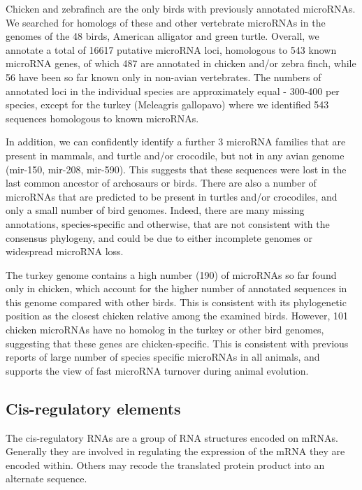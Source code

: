 \documentclass[10pt]{bmc_article}
\newenvironment{bmcformat}{\begin{raggedright}\baselineskip20pt\sloppy\setboolean{publ}{false}}{\end{raggedright}\baselineskip20pt\sloppy}
\begin{document}
\begin{bmcformat}
Chicken and zebrafinch are the only birds with previously annotated
microRNAs. We searched for homologs of these and other vertebrate
microRNAs in the genomes of the 48 birds, American alligator and green
turtle. Overall, we annotate a total of 16617 putative microRNA loci,
homologous to 543 known microRNA genes, of which 487 are annotated in
chicken and/or zebra finch, while 56 have been so far known only in
non-avian vertebrates. The numbers of annotated loci in the individual
species are approximately equal - 300-400 per species, except for the
turkey (Meleagris gallopavo) where we identified 543 sequences
homologous to known microRNAs.

In addition, we can confidently identify a further 3 microRNA
families that are present in mammals, and turtle and/or crocodile, but
not in any avian genome (mir-150, mir-208, mir-590). This suggests
that these sequences were lost in the last common ancestor of
archosaurs or birds. There are also a number of microRNAs that are
predicted to be present in turtles and/or crocodiles, and only a small
number of bird genomes. Indeed, there are many missing annotations,
species-specific and otherwise, that are not consistent with the
consensus phylogeny, and could be due to either incomplete genomes or
widespread microRNA loss.

The turkey genome contains a high number (190) of microRNAs so far
found only in chicken, which account for the higher number of
annotated sequences in this genome compared with other birds. This is
consistent with its phylogenetic position as the closest chicken
relative among the examined birds. However, 101 chicken microRNAs
have no homolog in the turkey or other bird genomes, suggesting that
these genes are chicken-specific. This is consistent with previous
reports of large number of species specific microRNAs in all animals,
and supports the view of fast microRNA turnover during animal
evolution.



\subsection*{Cis-regulatory elements}

The cis-regulatory RNAs are a group of RNA structures encoded on
mRNAs. Generally they are involved in regulating the expression of the
mRNA they are encoded within. Others may recode the translated protein
product into an alternate sequence.


\end{bmcformat}
\end{document}
